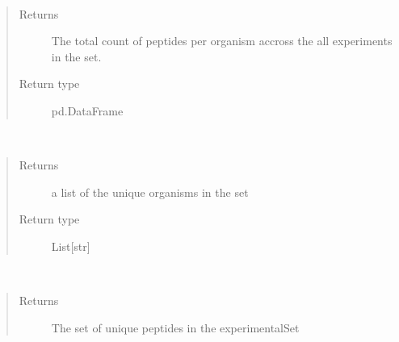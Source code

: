 \documentclass[letterpaper,10pt,english]{sphinxmanual}
\begin{document}
\begin{fulllineitems}
\begin{fulllineitems}
\label{\detokenize{IPTK.Classes:IPTK.Classes.ExperimentalSet.ExperimentSet.get_total_peptide_per_org_count}}~\begin{quote}\begin{description}
\item[{Returns}] \leavevmode
The total count of peptides per organism accross the all experiments in the set.

\item[{Return type}] \leavevmode
pd.DataFrame

\end{description}\end{quote}

\end{fulllineitems}


\begin{fulllineitems}
\label{\detokenize{IPTK.Classes:IPTK.Classes.ExperimentalSet.ExperimentSet.get_unique_orgs}}~\begin{quote}\begin{description}
\item[{Returns}] \leavevmode
a list of the unique organisms in the set

\item[{Return type}] \leavevmode
List{[}str{]}

\end{description}\end{quote}

\end{fulllineitems}


\begin{fulllineitems}
\label{\detokenize{IPTK.Classes:IPTK.Classes.ExperimentalSet.ExperimentSet.get_unique_peptides}}~\begin{quote}\begin{description}
\item[{Returns}] \leavevmode
The set of unique peptides in the experimentalSet


\end{description}
\end{quote}
\end{fulllineitems}
\end{fulllineitems}
\end{document}
